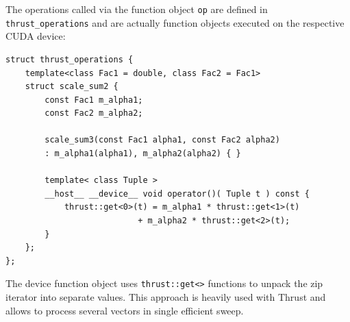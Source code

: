 \documentclass[final]{siamltex}
\newcommand{\code}[1]{\lstinline|#1|}
\begin{document}
The operations called via the function object \code{op} are defined in \code{thrust_operations}
and are actually function objects executed on the respective CUDA device:
\begin{lstlisting}
struct thrust_operations {
    template<class Fac1 = double, class Fac2 = Fac1>
    struct scale_sum2 {
        const Fac1 m_alpha1;
        const Fac2 m_alpha2;

        scale_sum3(const Fac1 alpha1, const Fac2 alpha2)
	    : m_alpha1(alpha1), m_alpha2(alpha2) { }

        template< class Tuple >
        __host__ __device__ void operator()( Tuple t ) const {
            thrust::get<0>(t) = m_alpha1 * thrust::get<1>(t)
	                       + m_alpha2 * thrust::get<2>(t);
        }
    };
};
\end{lstlisting}
The device function object uses \code{thrust::get<>} functions to unpack the zip iterator into separate values.
This approach is heavily used with Thrust and allows to process several vectors
in single efficient sweep. 
\end{document}
